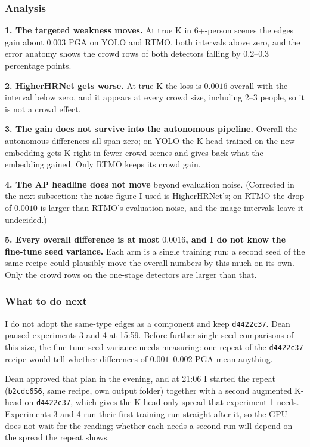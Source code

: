 \subsubsection{Analysis}

\textbf{1. The targeted weakness moves.} At true K in 6+-person scenes the edges gain about $0.003$ PGA on YOLO and RTMO, both intervals above zero, and the error anatomy shows the crowd rows of both detectors falling by 0.2--0.3 percentage points.

\textbf{2. HigherHRNet gets worse.} At true K the loss is $0.0016$ overall with the interval below zero, and it appears at every crowd size, including 2--3 people, so it is not a crowd effect.

\textbf{3. The gain does not survive into the autonomous pipeline.} Overall the autonomous differences all span zero; on YOLO the K-head trained on the new embedding gets K right in fewer crowd scenes and gives back what the embedding gained. Only RTMO keeps its crowd gain.

\textbf{4. The AP headline does not move} beyond evaluation noise. (Corrected in the next subsection: the noise figure I used is HigherHRNet's; on RTMO the drop of $0.0010$ is larger than RTMO's evaluation noise, and the image intervals leave it undecided.)

\textbf{5. Every overall difference is at most $0.0016$, and I do not know the fine-tune seed variance.} Each arm is a single training run; a second seed of the same recipe could plausibly move the overall numbers by this much on its own. Only the crowd rows on the one-stage detectors are larger than that.

\subsubsection{What to do next}

I do not adopt the same-type edges as a component and keep \texttt{d4422c37}. Dean paused experiments 3 and 4 at 15:59. Before further single-seed comparisons of this size, the fine-tune seed variance needs measuring: one repeat of the \texttt{d4422c37} recipe would tell whether differences of $0.001$--$0.002$ PGA mean anything.

Dean approved that plan in the evening, and at 21:06 I started the repeat (\texttt{b2cdc656}, same recipe, own output folder) together with a second augmented K-head on \texttt{d4422c37}, which gives the K-head-only spread that experiment 1 needs.
Experiments 3 and 4 run their first training run straight after it, so the GPU does not wait for the reading; whether each needs a second run will depend on the spread the repeat shows.

